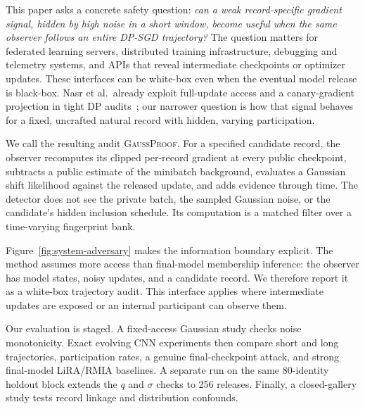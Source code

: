 \documentclass[conference]{IEEEtran}
\newcommand{\method}{\textsc{GaussProof}}
\begin{document}
This paper asks a concrete safety question: \emph{can a weak record-specific gradient signal, hidden by high noise in a short window, become useful when the same observer follows an entire DP-SGD trajectory?} The question matters for federated learning servers, distributed training infrastructure, debugging and telemetry systems, and APIs that reveal intermediate checkpoints or optimizer updates. These interfaces can be white-box even when the eventual model release is black-box. Nasr et al.\ already exploit full-update access and a canary-gradient projection in tight DP audits~\cite{nasr2023tight}; our narrower question is how that signal behaves for a fixed, uncrafted natural record with hidden, varying participation.

We call the resulting audit \method. For a specified candidate record, the observer recomputes its clipped per-record gradient at every public checkpoint, subtracts a public estimate of the minibatch background, evaluates a Gaussian shift likelihood against the released update, and adds evidence through time. The detector does not see the private batch, the sampled Gaussian noise, or the candidate's hidden inclusion schedule. Its computation is a matched filter over a time-varying fingerprint bank.

Figure~\ref{fig:system-adversary} makes the information boundary explicit. The method assumes more access than final-model membership inference: the observer has model states, noisy updates, and a candidate record. We therefore report it as a white-box trajectory audit. This interface applies where intermediate updates are exposed or an internal participant can observe them.

Our evaluation is staged. A fixed-access Gaussian study checks noise monotonicity. Exact evolving CNN experiments then compare short and long trajectories, participation rates, a genuine final-checkpoint attack, and strong final-model LiRA/RMIA baselines. A separate run on the same 80-identity holdout block extends the $q$ and $\sigma$ checks to 256 releases. Finally, a closed-gallery study tests record linkage and distribution confounds.
\end{document}
